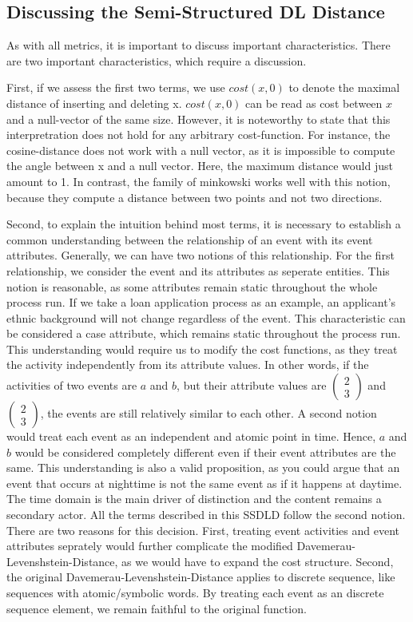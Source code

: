 \documentclass[./../../paper.tex]{subfiles}
\begin{document}
\subsection{Discussing the Semi-Structured DL Distance}
As with all metrics, it is important to discuss important characteristics. There are two important characteristics, which require a discussion.

First, if we assess the first two terms, we use $cost(x,0)$ to denote the maximal distance of inserting and deleting x. $cost(x,0)$ can be read as cost between $x$ and a null-vector of the same size. However, it is noteworthy to state that this interpretration does not hold for any arbitrary cost-function. For instance, the cosine-distance does not work with a null vector, as it is impossible to compute the angle between x and a null vector. Here, the maximum distance would just amount to 1. In contrast, the family of \Gls{minkowski} works well with this notion, because they compute a distance between two points and not two directions. 

Second, to explain the intuition behind most terms, it is necessary to establish a common understanding between the relationship of an event with its event attributes. Generally, we can have two notions of this relationship. For the first relationship, we consider the event and its attributes as seperate entities. This notion is reasonable, as some attributes remain static throughout the whole process run. If we take a loan application process as an example, an applicant's ethnic background will not change regardless of the event. This characteristic can be considered a case attribute, which remains static throughout the process run. This understanding would require us to modify the cost functions, as they treat the activity independently from its attribute values. In other words, if the activities of two events are $a$ and $b$, but their attribute values are $\left(\begin{smallmatrix}2 \\ 3\end{smallmatrix}\right)$ and $\left(\begin{smallmatrix}2 \\ 3\end{smallmatrix}\right)$, the events are still relatively similar to each other. A second notion would treat each event as an independent and atomic point in time. Hence, $a$ and $b$ would be considered completely different even if their event attributes are the same. This understanding is also a valid proposition, as you could argue that an event that occurs at nighttime is not the same event as if it happens at daytime. The time domain is the main driver of distinction and the content remains a secondary actor. All the terms described in this \gls{SSDLD} follow the second notion. There are two reasons for this decision. First, treating event activities and event attributes seprately would further complicate the modified Davemerau-Levenshstein-Distance, as we would have to expand the cost structure. Second, the original Davemerau-Levenshstein-Distance applies to discrete sequence, like sequences with atomic/symbolic words. By treating each event as an discrete sequence element, we remain faithful to the original function.
\end{document}
